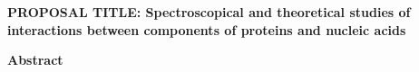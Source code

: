 
\setlength{\textwidth}{7.5in}
\setlength{\textheight}{9.0in}
\setlength{\oddsidemargin}{-.5in}
\setlength{\topmargin}{-.10in}
%
\newcommand{\beq}{\begin{equation}}
\newcommand{\eeq}{\end{equation}}






\setlength{\baselineskip}{1.5em}





\noindent
{\bf PROPOSAL TITLE: 
Spectroscopical and theoretical studies of interactions
between components of proteins and nucleic acids}

\vspace{2mm}

\noindent
{\bf Abstract}

